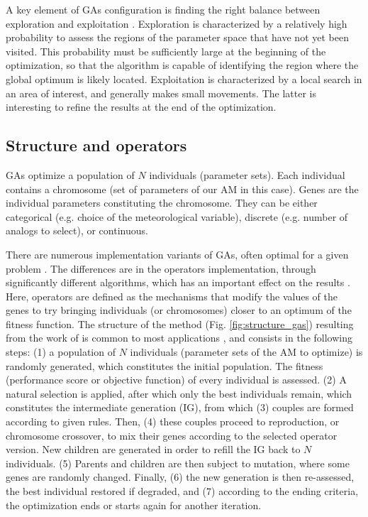 \documentclass{ametsoc}
\begin{document}
A key element of GAs configuration is finding the right balance between exploration and exploitation \citep{Back1992a, Smith1997a}. Exploration is characterized by a relatively high probability to assess the regions of the parameter space that have not yet been visited. This probability must be sufficiently large at the beginning of the optimization, so that the algorithm is capable of identifying the region where the global optimum is likely located. Exploitation is characterized by a local search in an area of interest, and generally makes small movements. The latter is interesting to refine the results at the end of the optimization.


\subsection{Structure and operators}
\label{sec:gas:operators}

GAs optimize a population of $N$ individuals (parameter sets). Each individual contains a chromosome (set of parameters of our AM in this case). Genes are the individual parameters constituting the chromosome. They can be either categorical (e.g. choice of the meteorological variable), discrete (e.g. number of analogs to select), or continuous.

There are numerous implementation variants of GAs, often optimal for a given problem \citep{Hart1991a, Schraudolph1992a}. The differences are in the operators implementation, through significantly different algorithms, which has an important effect on the results \citep{Gaffney2010a}. Here, operators are defined as the mechanisms that modify the values of the genes to try bringing individuals (or chromosomes) closer to an optimum of the fitness function. The structure of the method (Fig. \ref{fig:structure_gas}) resulting from the work of \citet{Holland1992b} is common to most applications \citep{Back1993b}, and consists in the following steps: (1) a population of $N$ individuals (parameter sets of the AM to optimize) is randomly generated, which constitutes the initial population. The fitness (performance score or objective function) of every individual is assessed. (2) A natural selection is applied, after which only the best individuals remain, which constitutes the intermediate generation (IG), from which (3) couples are formed according to given rules. Then, (4) these couples proceed to reproduction, or chromosome crossover, to mix their genes according to the selected operator version. New children are generated in order to refill the IG back to $N$ individuals. (5) Parents and children are then subject to mutation, where some genes are randomly changed. Finally, (6) the new generation is then re-assessed, the best individual restored if degraded, and (7) according to the ending criteria, the optimization ends or starts again for another iteration.
\end{document}
